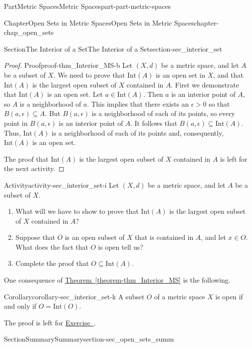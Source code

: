 \documentclass[oneside,10pt,]{book}
\newcommand{\xreffont}{\relax}
\numberwithin{equation}{chapter}
\newcommand{\Int}{\text{Int}}
\newcommand{\gt}{>}
\begin{document}
\begin{partptx}{Part}{Metric Spaces}{}{Metric Spaces}{}{}{part-part-metric-spaces}
\begin{chapterptx}{Chapter}{Open Sets in Metric Spaces}{}{Open Sets in Metric Spaces}{}{}{chapter-chap_open_sets}
\begin{sectionptx}{Section}{The Interior of a Set}{}{The Interior of a Set}{}{}{section-sec_interior_set}
\begin{proof}{Proof}{}{proof-thm_Interior_MS-b}
Let \((X,d)\) be a metric space, and let \(A\) be a subset of \(X\). We need to prove that \(\Int(A)\) is an open set in \(X\), and that \(\Int(A)\) is the largest open subset of \(X\) contained in \(A\). First we demonstrate that \(\Int(A)\) is an open set. Let \(a \in \Int(A)\). Then \(a\) is an interior point of \(A\), so \(A\) is a neighborhood of \(a\). This implies that there exists an \(\epsilon \gt 0\) so that \(B(a, \epsilon) \subseteq A\). But \(B(a, \epsilon)\) is a neighborhood of each of its points, so every point in \(B(a, \epsilon)\) is an interior point of \(A\). It follows that \(B(a, \epsilon) \subseteq \Int(A)\). Thus, \(\Int(A)\) is a neighborhood of each of its points and, consequently, \(\Int(A)\) is an open set.%
\par
The proof that \(\Int(A)\) is the largest open subset of \(X\) contained in \(A\) is left for the next activity.%
\end{proof}
\begin{activity}{Activity}{}{activity-sec_interior_set-i}%
Let \((X,d)\) be a metric space, and let \(A\) be a subset of \(X\).%
\begin{enumerate}[font=\bfseries,label=(\alph*),ref=\alph*]%
\item{}What will we have to show to prove that \(\Int(A)\) is the largest open subset of \(X\) contained in \(A\)?%
\item{}Suppose that \(O\) is an open subset of \(X\) that is contained in \(A\), and let \(x \in O\). What does the fact that \(O\) is open tell us?%
\item{}Complete the proof that \(O \subseteq \Int(A)\).%
\end{enumerate}%
\end{activity}%
One consequence of \hyperref[theorem-thm_Interior_MS]{Theorem~{\xreffont\ref{theorem-thm_Interior_MS}}} is the following.%
\begin{corollary}{Corollary}{}{}{corollary-sec_interior_set-k}%
A subset \(O\) of a metric space \(X\) is open if and only if \(O = \Int(O)\).%
\end{corollary}
The proof is left for \hyperlink{exercise-ex_O_int_O}{Exercise~{\xreffont 2}}.%
\end{sectionptx}
%
%
\typeout{************************************************}
\typeout{************************************************}
%
\begin{sectionptx}{Section}{Summary}{}{Summary}{}{}{section-sec_open_sets_summ}

\end{sectionptx}
\end{chapterptx}
\end{partptx}
\end{document}
